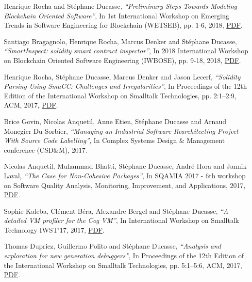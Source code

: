 \documentclass{article}
\newcommand{\czauthors}[1]{#1}
\newcommand{\cztitle}[1]{\emph{``#1''}}
\newcommand{\czbooktitle}[1]{#1}
\begin{document}
\begin{itemize}
	\pub  \czauthors{Henrique Rocha and St\'ephane Ducasse},  \cztitle{Preliminary Steps Towards Modeling Blockchain Oriented Software},  In \czbooktitle{1st International Workshop on Emerging Trends in Software Engineering for Blockchain (WETSEB)}, pp. 1-6, 2018, \href{http://rmod-files.lille.inria.fr/Team/Texts/Papers/Rocha18a-WETSEB-Modeling.pdf}{PDF}.

	\pub  \czauthors{Santiago Bragagnolo, Henrique Rocha, Marcus Denker and St\'ephane Ducasse},  \cztitle{SmartInspect: solidity smart contract inspector},  In \czbooktitle{2018 International Workshop on Blockchain Oriented Software Engineering (IWBOSE)}, pp. 9-18, 2018, \href{http://rmod-files.lille.inria.fr/Team/Texts/Papers/Braga18a-IWBOSE-SmartInspect.pdf}{PDF}.

	\pub  \czauthors{Henrique Rocha, St\'ephane Ducasse, Marcus Denker and Jason Lecerf},  \cztitle{Solidity Parsing Using SmaCC: Challenges and Irregularities},  In \czbooktitle{Proceedings of the 12th Edition of the International Workshop on Smalltalk Technologies}, pp. 2:1--2:9, ACM, 2017, \href{http://rmod-files.lille.inria.fr/Team/Texts/Papers/Roch17a-IWST-SolidityParser.pdf}{PDF}.

	\pub  \czauthors{Brice Govin, Nicolas Anquetil, Anne Etien, St\'ephane Ducasse and Arnaud Monegier Du Sorbier},  \cztitle{{Managing an Industrial Software Rearchitecting Project With Source Code Labelling}},  In \czbooktitle{{Complex Systems Design \& Management conference  (CSD\&M)}}, 2017.

	\pub  \czauthors{Nicolas Anquetil, Muhammad Bhatti, St\'ephane Ducasse, Andr\'e Hora and Jannik Laval},  \cztitle{The Case for Non-Cohesive Packages},  In \czbooktitle{SQAMIA 2017 - 6th workshop on Software Quality Analysis, Monitoring, Improvement, and Applications}, 2017, \href{http://rmod-files.lille.inria.fr/Team/Texts/Papers/Anqu17b-Sqamia-Metrics.pdf}{PDF}.

	\pub  \czauthors{Sophie Kaleba, Cl\'ement B\'era, Alexandre Bergel and St\'ephane Ducasse},  \cztitle{A detailed VM profiler for the Cog VM},  In \czbooktitle{International Workshop on Smalltalk Technology {IWST'17}}, 2017, \href{http://rmod-files.lille.inria.fr/Team/Texts/Papers/Kale17a-IWST-VMProfiler.pdf}{PDF}.

	\pub  \czauthors{Thomas Dupriez, Guillermo Polito and St\'ephane Ducasse},  \cztitle{Analysis and exploration for new generation debuggers},  In \czbooktitle{Proceedings of the 12th Edition of the International Workshop on Smalltalk Technologies}, pp. 5:1--5:6, ACM, 2017, \href{http://rmod-files.lille.inria.fr/Team/Texts/Papers/Dupr17a-IWST-NewGenerationDebuggers.pdf}{PDF}.


\end{itemize}
\end{document}
